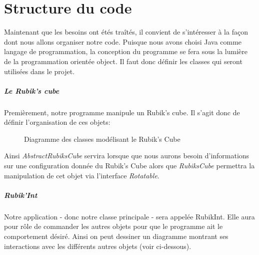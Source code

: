 \chapter{Structure du code}

Maintenant que les besoins ont étés traîtés, il convient de s'intéresser à la façon dont nous allons organiser notre code. Puisque nous avons choisi Java comme langage de programmation, la conception du programme se fera sous la lumière de la programmation orientée object. Il faut donc définir les classes qui seront utilisées dans le projet.

\paragraph{Le Rubik's cube} Premièrement, notre programme manipule un Rubik's cube. Il s'agit donc de définir l'organisation de ces objets:

\begin{figure}[h]
\begin{center}
\end{center}
    \caption{Diagramme des classes modélisant le Rubik's Cube}
\end{figure}

Ainsi \textit{AbstractRubiksCube} servira lorsque que nous aurons besoin d'informations sur une configuration donnée du Rubik's Cube alors que \textit{RubiksCube} permettra la manipulation de cet objet via l'interface \textit{Rotatable}. 


\paragraph{Rubik'Int} Notre application - donc notre classe principale - sera appelée RubikInt. Elle aura pour rôle de commander les autres objets pour que le programme ait le comportement désiré. Ainsi on peut dessiner un diagramme montrant ses interactions avec les différents autres objets (voir ci-dessous).

